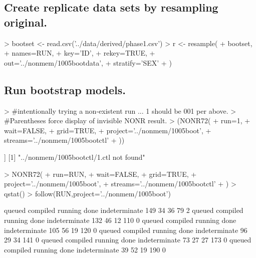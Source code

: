 \subsection{Create replicate data sets by resampling original.}
\begin{Schunk}
\begin{Sinput}
>  bootset <- read.csv('../data/derived/phase1.csv')
>  r <- resample(
+  	bootset,
+  	names=RUN,
+  	key='ID',
+  	rekey=TRUE,
+  	out='../nonmem/1005bootdata',
+  	stratify='SEX'
+  )
\end{Sinput}
\end{Schunk}
\subsection{Run bootstrap models.}
\begin{Schunk}
\begin{Sinput}
> #intentionally trying a non-existent run ... 1 should be 001 per above. 
> #Parentheses force display of invisible NONR result.
> (NONR72(
+      run=1,
+      wait=FALSE,
+      grid=TRUE,
+      project='../nonmem/1005boot',
+      streams='../nonmem/1005bootctl'
+ ))
\end{Sinput}
\begin{Soutput}
[[1]]
[1] "../nonmem/1005bootctl/1.ctl not found"
\end{Soutput}
\begin{Sinput}
> NONR72(
+      run=RUN,
+      wait=FALSE,
+      grid=TRUE,
+      project='../nonmem/1005boot',
+      streams='../nonmem/1005bootctl'
+ )
> qstat()
> follow(RUN,project='../nonmem/1005boot')
\end{Sinput}
\begin{Soutput}
       queued      compiled       running          done indeterminate 
          149            34            36            79             2 
       queued      compiled       running          done indeterminate 
          132            46            12           110             0 
       queued      compiled       running          done indeterminate 
          105            56            19           120             0 
       queued      compiled       running          done indeterminate 
           96            29            34           141             0 
       queued      compiled       running          done indeterminate 
           73            27            27           173             0 
       queued      compiled       running          done indeterminate 
           39            52            19           190             0 

\end{Soutput}
\end{Schunk}
